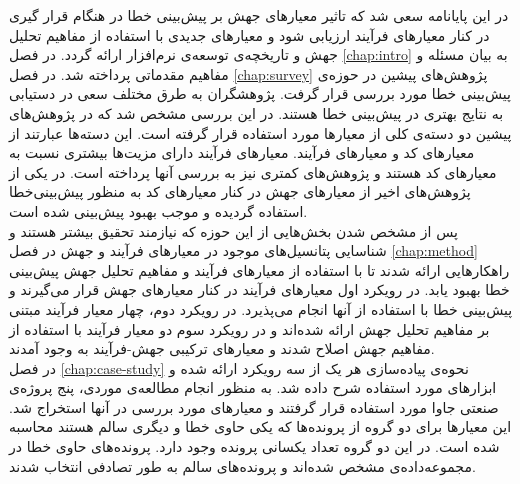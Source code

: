 در این پایانامه سعی شد که تاثیر معیار‌های جهش بر پیش‌بینی خطا در هنگام قرار گیری در کنار معیار‌های فرآیند ارزیابی  شود و معیارهای جدیدی با استفاده از مفاهیم تحلیل جهش و تاریخچه‌ی توسعه‌ی نرم‌افزار ارائه گردد. در فصل \ref{chap:intro} به بیان مسئله و مفاهیم مقدماتی پرداخته شد. در فصل \ref{chap:survey}  پژوهش‌های پیشین در حوزه‌ی پیش‌بینی خطا مورد بررسی قرار گرفت. پژوهشگران به طرق مختلف سعی در دستیابی به نتایج بهتری در پیش‌بینی خطا هستند. در این بررسی مشخص شد که در پژوهش‌های پیشین دو دسته‌ی کلی از معیارها مورد استفاده قرار گرفته است. این دسته‌ها عبارتند از معیارهای کد و معیارهای فرآیند. معیارهای فرآیند دارای مزیت‌ها بیشتری نسبت به معیارهای کد هستند و پژوهش‌های کمتری نیز به بررسی آنها پرداخته است. در یکی از پژوهش‌های اخیر از معیارهای جهش  در کنار معیارهای کد به منظور پیش‌بینی‌خطا استفاده گردیده و موجب بهبود پیش‌بینی شده است. \\

پس از مشخص شدن بخش‌هایی از این حوزه که نیازمند تحقیق بیشتر هستند و شناسایی پتانسیل‌های موجود در معیارهای فرآیند و جهش در فصل \ref{chap:method} راهکارهایی ارائه شدند تا با استفاده از معیارهای فرآیند و مفاهیم تحلیل جهش پیش‌بینی خطا بهبود یابد. در رویکرد اول معیارهای فرآیند در کنار معیارهای جهش قرار می‌گیرند و پیش‌بینی خطا با استفاده از آنها انجام می‌پذیرد. در رویکرد دوم، چهار معیار فرآیند مبتنی بر مفاهیم تحلیل جهش ارائه شده‌اند و در رویکرد سوم دو معیار فرآیند با استفاده از مفاهیم جهش اصلاح شدند و معیارهای ترکیبی جهش-فرآیند به وجود آمدند. \\

در فصل \ref{chap:case-study}  نحوه‌ی پیاده‌سازی هر یک از سه رویکرد ارائه شده و ابزارهای مورد استفاده شرح داده شد. به منظور انجام مطالعه‌ی موردی، پنج پروژه‌ی صنعتی جاوا مورد استفاده قرار گرفتند و معیارهای مورد بررسی در آنها استخراج شد. این معیارها برای دو گروه از پرونده‌ها که یکی حاوی خطا و دیگری سالم هستند محاسبه شده است. در این دو گروه تعداد یکسانی پرونده وجود دارد. پرونده‌های حاوی خطا در مجموعه‌داده‌ی  مشخص شده‌اند و پرونده‌های سالم به طور تصادفی انتخاب شدند. \\

